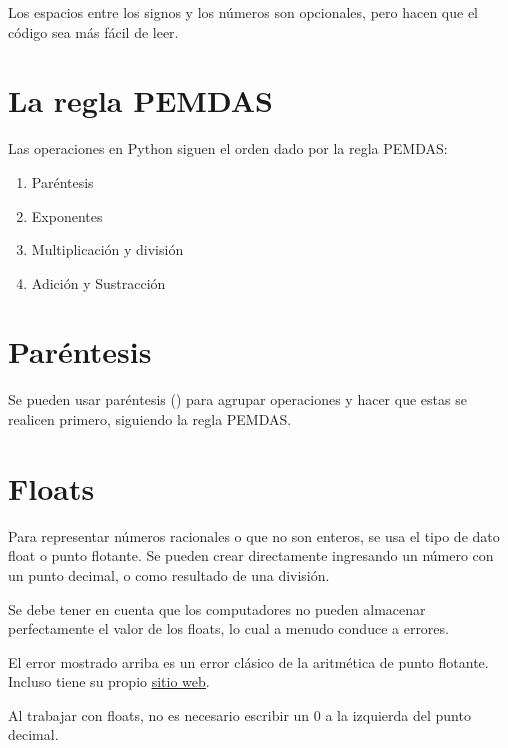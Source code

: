 \documentclass{report}
\begin{document}

Los espacios entre los signos y los números son opcionales, pero hacen que el código sea más fácil de leer.

\section{La regla PEMDAS}

Las operaciones en Python siguen el orden dado por la regla PEMDAS:

\begin{enumerate}
  \item Paréntesis
  \item Exponentes
  \item Multiplicación y división
  \item Adición y Sustracción
\end{enumerate}


\section{Paréntesis}

Se pueden usar paréntesis () para agrupar operaciones y hacer que estas se realicen primero, siguiendo la regla PEMDAS.


\section{Floats}
    
Para representar números racionales o que no son enteros, se usa el tipo de dato float o punto flotante. Se pueden crear directamente ingresando un número con un punto decimal, o como resultado de una división.


Se debe tener en cuenta que los computadores no pueden almacenar perfectamente el valor de los floats, lo cual a menudo conduce a errores.


El error mostrado arriba es un error clásico de la aritmética de punto flotante. Incluso tiene su propio \href{https://0.30000000000000004.com}{\underline{sitio web}}.

Al trabajar con floats, no es necesario escribir un 0 a la izquierda del punto decimal.
\end{document}
